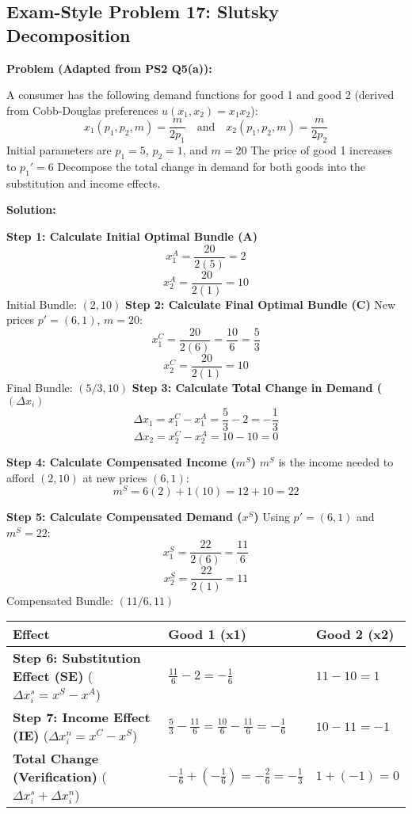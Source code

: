 \documentclass{article}
\begin{document}
\subsection*{Exam-Style Problem 17: Slutsky Decomposition}

\textbf{Problem (Adapted from PS2 Q5(a)):}

A consumer has the following demand functions for good 1 and good 2 (derived from Cobb-Douglas preferences $u(x_1, x_2) = x_1 x_2$): \[x_1(p_1, p_2, m) = \frac{m}{2p_1} \quad \text{and} \quad x_2(p_1, p_2, m) = \frac{m}{2p_2}\] Initial parameters are $p_1=5$, $p_2=1$, and $m=20$ The price of good 1 increases to $p_1'=6$ Decompose the total change in demand for both goods into the substitution and income effects.

\textbf{Solution:}

\textbf{Step 1: Calculate Initial Optimal Bundle (A)} \[ x_1^A = \frac{20}{2(5)} = 2 \] \[ x_2^A = \frac{20}{2(1)} = 10 \] Initial Bundle: $(2, 10)$
\textbf{Step 2: Calculate Final Optimal Bundle (C)} New prices $p'=(6, 1)$, $m=20$: \[ x_1^C = \frac{20}{2(6)} = \frac{10}{6} = \frac{5}{3} \] \[ x_2^C = \frac{20}{2(1)} = 10 \] Final Bundle: $(5/3, 10)$
\textbf{Step 3: Calculate Total Change in Demand ($(\Delta x_i)$} 
\[ \Delta x_1 = x_1^C - x_1^A = \frac{5}{3} - 2 = -\frac{1}{3} \] 
\[ \Delta x_2 = x_2^C - x_2^A = 10 - 10 = 0 \]

\textbf{Step 4: Calculate Compensated Income ($m^S$)} $m^S$ is the income needed to afford $(2, 10)$ at new prices $(6, 1)$: \[ m^S = 6(2) + 1(10) = 12 + 10 = 22 \]

\textbf{Step 5: Calculate Compensated Demand ($x^S$)} Using $p'=(6, 1)$ and $m^S=22$: \[ x_1^S = \frac{22}{2(6)} = \frac{11}{6} \] \[ x_2^S = \frac{22}{2(1)} = 11 \] Compensated Bundle: $(11/6, 11)$
\begin{center}
\begin{tabular}{p{7.5cm}ll}
\toprule
Effect& Good 1 (x1)& Good 2 (x2) \\
\midrule
\textbf{Step 6: Substitution Effect (SE)} ($\Delta x_i^s = x^S - x^A$)& $\frac{11}{6} - 2 = -\frac{1}{6}$& $11 - 10 = 1$ \\
\addlinespace
\textbf{Step 7: Income Effect (IE)} ($\Delta x_i^n = x^C - x^S$)& $\frac{5}{3} - \frac{11}{6} = \frac{10}{6} - \frac{11}{6} = -\frac{1}{6}$& $10 - 11 = -1$ \\
\addlinespace
\textbf{Total Change (Verification)} ($\Delta x_i^s + \Delta x_i^n$)& $-\frac{1}{6} + (-\frac{1}{6}) = -\frac{2}{6} = -\frac{1}{3}$& $1 + (-1) = 0$ \\
\bottomrule

\end{tabular}

\end{center}
\end{document}
